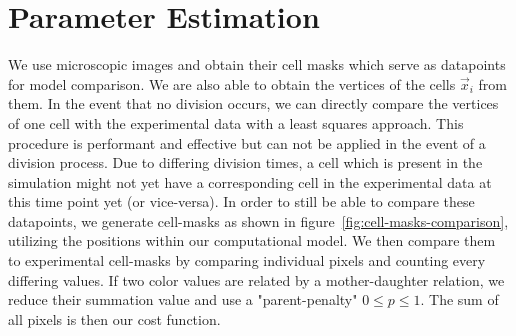 \documentclass[twocolumn]{article}
\begin{document}
\section{Parameter Estimation}
We use microscopic images and obtain their cell masks which serve as datapoints for model comparison.
We are also able to obtain the vertices of the cells $\vec{x}_i$ from them.
In the event that no division occurs, we can directly compare the vertices of one cell
with the experimental data with a least squares approach.
This procedure is performant and effective but can not be applied in the event of a division process.
Due to differing division times, a cell which is present in the simulation might not yet have a
corresponding cell in the experimental data at this time point yet (or vice-versa).
In order to still be able to compare these datapoints, we generate cell-masks as shown in
figure~\ref{fig:cell-masks-comparison}, utilizing the positions within our computational model.
We then compare them to experimental cell-masks by comparing individual pixels and counting every
differing values.
If two color values are related by a mother-daughter relation, we reduce their summation value and
use a "parent-penalty" $0\leq p\leq 1$.
The sum of all pixels is then our cost function.
\end{document}
